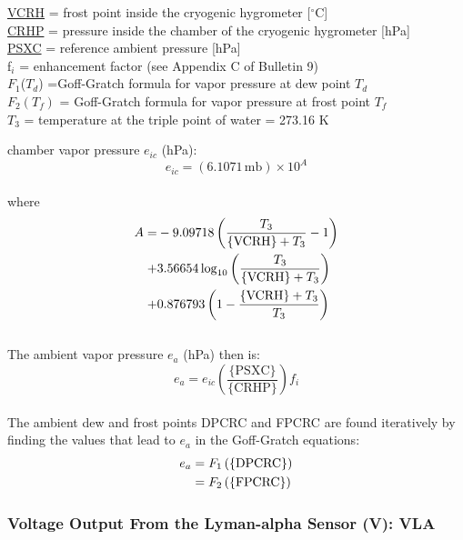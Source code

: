\documentclass[
]{book}
\begin{document}
\protect\hyperlink{cryo-hygro}{VCRH} = frost point inside the cryogenic hygrometer {[}\(^{\circ}\)C{]}\\
\protect\hyperlink{cryo-hygro}{CRHP} = pressure inside the chamber of the cryogenic hygrometer {[}hPa{]}\\
\href{./4-the-state-of-the-atmosphere.html\#psx}{PSXC} = reference ambient pressure {[}hPa{]}\\
f\(_{i}\) = enhancement factor (see Appendix C of Bulletin 9)\\
\(F_{1}\)(\(T_{d}\)) =Goff-Gratch formula for vapor pressure at dew
point \(T_{d}\)\\
\(F_{2}(T_{f})\) = Goff-Gratch formula for vapor pressure at frost
point \(T_{f}\)\\
\(T_{3}\) = temperature at the triple point of water = 273.16 K

chamber vapor pressure \(e_{ic}\) (hPa):\\
\begin{equation}
e_{ic}=(6.1071\,\mathrm{mb})\times10^{A}  
\label{eq:DPCRCbox1}
\end{equation}\\
where
\begin{align}  
A=&-9.09718\left(\frac{T_{3}}{\mathrm{\{VCRH\}}+T_{3}}-1\right) \notag \\
+ & 3.56654\log_{10}\left(\frac{T_{3}}{\mathrm{\{VCRH\}}+T_{3}}\right) \notag \\
+ & 0.876793\left(1-\frac{\mathrm{\{VCRH\}}+T_{3}}{T_{3}}\right)
\label{eq:DPCRCbox2}
\end{align}\\
The ambient vapor pressure \(e_{a}\) (hPa) then is:\\
\begin{equation}
e_{a}=e_{ic}\left(\frac{\mathrm{\{PSXC\}}}{\mathrm{\{CRHP\}}}\right)f_{i}
\label{eq:DPCRCbox3}
\end{equation}\\
The ambient dew and frost points DPCRC and FPCRC are found iteratively by finding
the values that lead to \(e_a\) in the Goff-Gratch equations:\\
\begin{align}
e_{a} & = F_{1}\left(\mathrm{\{DPCRC\}}\right)\notag \\
 & = F_{2}\left(\mathrm{\{FPCRC\}}\right)
\label{eq:DPXRXbox4}
\end{align}

\hypertarget{vla}{%
\subsubsection*{Voltage Output From the Lyman-alpha Sensor (V): VLA}\label{vla}}
\end{document}

